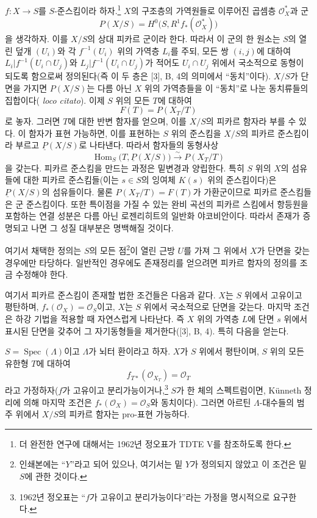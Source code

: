 $f:X\longrightarrow S$를 $S$-준스킴이라 하자.\footnote{더 완전한 연구에
대해서는 1962년 정오표가 TDTE V를 참조하도록 한다.} $X$의 구조층의
가역원들로 이루어진 곱셈층 $\mathcal O_X^*$과 군
\[
  P(X/S)=H^0\bigl(S,R^1f_*(\mathcal O_X^*)\bigr)
\]
을 생각하자. 이를 $X/S$의 상대 피카르 군이라 한다. 따라서 이 군의 한
원소는 $S$의 열린 덮개 $(U_i)$와 각 $f^{-1}(U_i)$ 위의 가역층 $L_i$를
주되, 모든 쌍 $(i,j)$에 대하여
$L_i|f^{-1}(U_i\cap U_j)$와 $L_j|f^{-1}(U_i\cap U_j)$가 적어도
$U_i\cap U_j$ 위에서 국소적으로 동형이 되도록 함으로써 정의된다(즉 이
두 층은 [3], B, 4의 의미에서 ``동치''이다). $X/S$가 단면을 가지면
$P(X/S)$는 다름 아닌 $X$ 위의 가역층들을 이 ``동치''로 나눈 동치류들의
집합이다(
\textit{loco citato}). 이제 $S$ 위의 모든 $T$에 대하여
\[
  F(T)=P(X_T/T)
\]
로 놓자. 그러면 $T$에 대한 반변 함자를 얻으며, 이를 $X/S$의 피카르
함자라 부를 수 있다. 이 함자가 표현 가능하면, 이를 표현하는 $S$ 위의
준스킴을 $X/S$의 피카르 준스킴이라 부르고 $\underline P(X/S)$로 나타낸다.
따라서 함자들의 동형사상
\[
  \operatorname{Hom}_S\bigl(T,\underline P(X/S)\bigr)
  \xrightarrow{\sim}P(X_T/T)
\]
을 갖는다. 피카르 준스킴을 만드는 과정은 밑변경과 양립한다. 특히 $S$
위의 $X$의 섬유들에 대한 피카르 준스킴들(이는 $s\in S$의 잉여체
$K(s)$ 위의 준스킴이다)은 $\underline P(X/S)$의 섬유들이다. 물론
$P(X_T/T)=F(T)$가 가환군이므로 피카르 준스킴들은 군 준스킴이다. 또한
특이점을 가질 수 있는 완비 곡선의 피카르 스킴에서 항등원을 포함하는 연결
성분은 다름 아닌 로젠리히트의 일반화 야코비안이다. 따라서 존재가 증명되고
나면 그 성질 대부분은 명백해질 것이다.

 여기서 채택한 정의는 $S$의 모든 점\footnote{인쇄본에는
``$Y$''라고 되어 있으나, 여기서는 밑 $Y$가 정의되지 않았고 이 조건은 밑
$S$에 관한 것이다.}이 열린 근방 $U$를 가져 그 위에서 $X$가 단면을 갖는
경우에만 타당하다. 일반적인 경우에도 존재정리를 얻으려면 피카르 함자의
정의를 조금 수정해야 한다.

여기서 피카르 준스킴이 존재할 법한 조건들은 다음과 같다. $X$는 $S$
위에서 고유이고 평탄하며, $f_*(\mathcal O_X)=\mathcal O_S$이고, $X$는
$S$ 위에서 국소적으로 단면을 갖는다. 마지막 조건은 하강 기법을 적용할 때
자연스럽게 나타난다. 즉 $X$ 위의 가역층 $L$에 단면 $s$ 위에서 표시된
단면을 갖추어 그 자기동형들을 제거한다([3], B, 4). 특히 다음을 얻는다.

 $S=\operatorname{Spec}(\Lambda)$이고 $\Lambda$가
뇌터 환이라고 하자. $X$가 $S$ 위에서 평탄이며, $S$ 위의 모든 유한형
$T$에 대하여
\[
  f_{T*}(\mathcal O_{X_T})=\mathcal O_T
\]
라고 가정하자($f$가 고유이고 분리가능이거나,\footnote{1962년 정오표는
``$f$가 고유이고 분리가능이다''라는 가정을 명시적으로 요구한다.} $S$가
한 체의 스펙트럼이면, K\"unneth 정리에 의해 마지막 조건은
$f_*(\mathcal O_X)=\mathcal O_S$와 동치이다). 그러면 아르틴
$\Lambda$-대수들의 범주 위에서 $X/S$의 피카르 함자는 pro-표현 가능하다.

